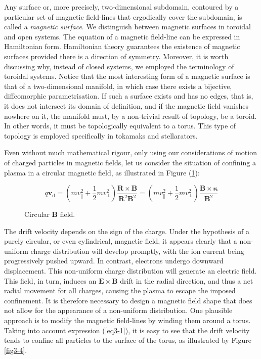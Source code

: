 Any surface or, more precisely, two-dimensional subdomain, contoured by a particular set of magnetic field-lines that ergodically cover the subdomain, is called a \textit{magnetic surface}. We distinguish between magnetic surfaces in toroidal and open systems. The equation of a magnetic field-line can be expressed in Hamiltonian form. Hamiltonian theory guarantees the existence of magnetic surfaces provided there is a direction of symmetry. Moreover, it is worth discussing why, instead of closed systems, we employed the terminology of toroidal systems. Notice that the most interesting form of a magnetic surface is that of a two-dimensional manifold, in which case there exists a bijective, diffeomorphic parametrisation. If such a surface exists and has no edges, that is, it does not intersect its domain of definition, and if the magnetic field vanishes nowhere on it, the manifold must, by a non-trivial result of topology, be a toroid. In other words, it must be topologically equivalent to a torus. This type of topology is employed specifically in tokamaks and stellarators.

\quad Even without much mathematical rigour, only using our considerations of motion of charged particles in magnetic fields, let us consider the situation of confining a plasma in a circular magnetic field, as illustrated in Figure (\ref{fig3-3}):

\begin{equation}
    \label{eq3-1}
    q\mathbf{v}_\mathrm{d}=\left(mv_\parallel^2+\frac{1}{2}mv_\perp^2\right)\frac{\mathbf{R}\times\mathbf{B}}{\mathbf{R}^2\mathbf{B}^2}=\left(mv_\parallel^2+\frac{1}{2}mv_\perp^2\right)\frac{\mathbf{B}\times\boldsymbol{\kappa}}{\mathbf{B}^2}
\end{equation}

\begin{figure}[H]
    \centering
    \scalebox{1}{}
    \caption{Circular $\mathbf{B}$ field.}
    \label{fig3-3}
\end{figure}

The drift velocity depends on the sign of the charge. Under the hypothesis of a purely circular, or even cylindrical, magnetic field, it appears clearly that a non-uniform charge distribution will develop promptly, with the ion current being progressively pushed upward. In contrast, electrons undergo downward displacement. This non-uniform charge distribution will generate an electric field. This field, in turn, induces an $\mathbf{E} \times \mathbf{B}$ drift in the radial direction, and thus a net radial movement for all charges, causing the plasma to escape the imposed confinement. It is therefore necessary to design a magnetic field shape that does not allow for the appearance of a non-uniform distribution. One plausible approach is to modify the magnetic field-lines by winding them around a torus. Taking into account expression (\ref{eq3-1}), it is easy to see that the drift velocity tends to confine all particles to the surface of the torus, as illustrated by Figure \ref{fig3-4}.


